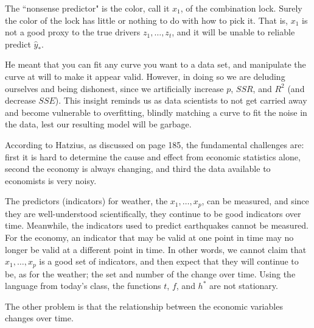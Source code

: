 \documentclass[12pt]{article}
\begin{document}
\begin{enumerate}

The ``nonsense predictor" is the color, call it $x_1$, of the combination lock. Surely the
color of the lock has little or nothing to do with how to pick it. That is,
$x_1$ is not a good proxy to the true drivers $z_1,\ldots,z_t$, and it
will be unable to reliable predict $\hat{y}_*$.



He meant that you can fit any curve you want to a data set, and manipulate the curve
at will to make it appear valid. However, in doing so we are deluding ourselves and
being dishonest, since we artificially increase $p$, $SSR$, and $R^2$ (and decrease $SSE$).
This insight reminds us as data scientists to not get carried away and become vulnerable
to overfitting, blindly matching a curve to fit the noise in the data, lest our resulting
model will be garbage.


According to Hatzius, as discussed on page 185, the fundamental challenges are:
first it is hard to determine the cause and effect from economic statistics alone,
second the economy is always changing, and third the data available to economists
is very noisy.

The predictors (indicators) for weather, the $x_1,\ldots,x_p$,
can be measured, and since they are well-understood scientifically, they continue
to be good indicators over time. Meanwhile, the indicators used to predict earthquakes
cannot be measured. For the economy, an indicator that may be valid at one point
in time may no longer be valid at a different point in time. In other words,
we cannot claim that $x_1,\ldots,x_p$ is a good set of indicators, and then
expect that they will continue to be, as for the weather; the set and number of
the change over time. Using the language from today's class, the functions $t$, $f$,
and $h^*$ are not stationary.

The other problem is that the relationship between the economic variables changes
over time.



\end{enumerate}
\end{document}
